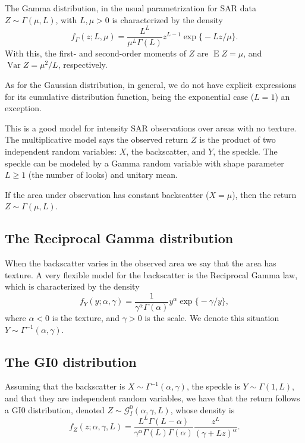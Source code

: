 The Gamma distribution, in the usual parametrization for SAR data $Z\sim\Gamma(\mu,L)$, with $L,\mu>0$ is characterized by the density
\begin{equation}
f_\Gamma(z;L,\mu) = \frac{L^L}{\mu^{L}\Gamma(L)} z^{L-1} 
	\exp\big\{ -L z / \mu
	\big\}.
\label{eq:SARGammaDensity}
\end{equation}
With this, the first- and second-order moments of $Z$ are
$\operatorname{E}Z=\mu$,
and 
$\operatorname{Var}Z=\mu^2/L$,
respectively.

As for the Gaussian distribution, in general, we do not have explicit expressions for its cumulative distribution function, being the exponential case ($L=1$) an exception.

This is a good model for intensity SAR observations over areas with no texture.
The multiplicative model says the observed return $Z$ is the product of two independent random variables:
$X$, the backscatter, and
$Y$, the speckle.
The speckle can be modeled by a Gamma random variable with shape parameter $L\geq1$ (the number of looks) and unitary mean.

If the area under observation has constant backscatter ($X=\mu$), then the return $Z\sim\Gamma(\mu,L)$.

\subsection{The Reciprocal Gamma distribution}

When the backscatter varies in the observed area we say that the area has texture.
A very flexible model for the backscatter is the Reciprocal Gamma law\cite{frery96}, which is characterized by the density
\begin{equation}
f_Y(y;\alpha,\gamma)= \frac{1}{\gamma^\alpha \Gamma(\alpha)}
y^\alpha \exp\big\{-\gamma/y\big\},
\label{eq:IGDensity}
\end{equation}
where $\alpha<0$ is the texture, and
$\gamma>0$ is the scale.
We denote this situation $Y\sim \Gamma^{-1}(\alpha,\gamma)$.

\subsection{The GI0 distribution}

Assuming that the backscatter is $X\sim\Gamma^{-1}(\alpha,\gamma)$,
the speckle is $Y\sim\Gamma(1,L)$, and that they are independent random variables, we have that the return follows a GI0 distribution\cite{GeodesicDistanceGI0JSTARS,ParameterEstimationSARStochasticDistancesKernels}, denoted $Z\sim\mathcal G_I^0(\alpha,\gamma,L)$, whose density is
\begin{equation}
f_Z(z;\alpha,\gamma,L) = \frac{L^L \Gamma(L-\alpha)}{\gamma^\alpha \Gamma(L) \Gamma(\alpha)}
\frac{z^L}{(\gamma+Lz)^\alpha}.
\end{equation}

